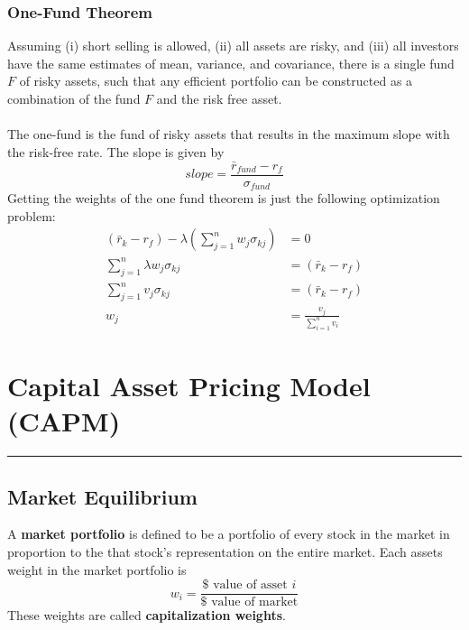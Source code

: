 \documentclass[11pt]{article}
\begin{document}
\subsubsection{One-Fund Theorem}
Assuming (i) short selling is allowed, (ii) all assets are risky, and (iii) all investors have the same estimates of mean, variance, and covariance,  there is a single fund $F$ of risky assets, such that any efficient portfolio can be constructed as a combination of the fund $F$ and the risk free asset.  \\ \\ The one-fund is the fund of risky assets that results in the maximum slope with the risk-free rate.  The slope is given by 
$$ slope =  \frac{ \bar{r}_{fund} - r_f}{\sigma_{fund}}$$
Getting the weights of the one fund theorem is just the following optimization problem:
\begin{align*}
(\bar{r}_k - r_f) - \lambda \left( \sum_{j=1}^n w_j \sigma_{kj} \right) &= 0  \\
 \sum_{j=1}^n \lambda w_j \sigma_{kj}  &= (\bar{r}_k - r_f) \\
 \sum_{j=1}^n v_j \sigma_{kj}  &= (\bar{r}_k - r_f)  \\
 w_j &= \frac{v_j}{\sum_{i=1}^n v_i}
\end{align*}

\pagebreak
\section{Capital Asset Pricing Model (CAPM)}
\hrule \vspace{15pt}

\subsection{Market Equilibrium}
A \textbf{market portfolio} is defined to be a portfolio of every stock in the market in proportion to the that stock's representation on the entire market.  Each assets weight in the market portfolio is 
$$ w_i = \frac{\$ \text{ value of asset } i}{\$ \text{ value of market}}$$
These weights are called \textbf{capitalization weights}.
\end{document}

